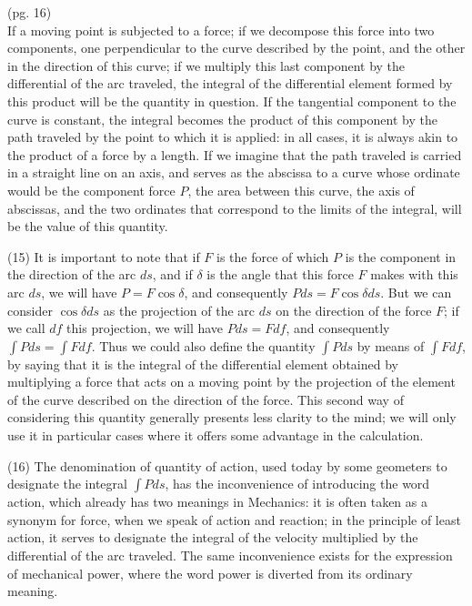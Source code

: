 \documentclass{book}
\begin{document}
\newpage
(pg. 16)\\
If a moving point is subjected to a force; if we decompose this force into two components, one perpendicular to the curve described by the point, and the other in the direction of this curve; if we multiply this last component by the differential of the arc traveled, the integral of the differential element formed by this product will be the quantity in question.
If the tangential component to the curve is constant, the integral becomes the product of this component by the path traveled by the point to which it is applied: in all cases, it is always akin to the product of a force by a length.
If we imagine that the path traveled is carried in a straight line on an axis, and serves as the abscissa to a curve whose ordinate would be the component force \(P\), the area between this curve, the axis of abscissas, and the two ordinates that correspond to the limits of the integral, will be the value of this quantity.

(15) It is important to note that if \(F\) is the force of which \(P\) is the component in the direction of the arc \(ds\), and if \(\delta\) is the angle that this force \(F\) makes with this arc \(ds\), we will have \(P = F \cos \delta\), and consequently \(Pds = F \cos \delta ds\). But we can consider \(\cos \delta ds\) as the projection of the arc \(ds\) on the direction of the force \(F\); if we call \(df\) this projection, we will have \(Pds = Fdf\), and consequently \(\int Pds = \int Fdf\). Thus we could also define the quantity \(\int Pds\) by means of \(\int Fdf\), by saying that it is the integral of the differential element obtained by multiplying a force that acts on a moving point by the projection of the element of the curve described on the direction of the force. This second way of considering this quantity generally presents less clarity to the mind; we will only use it in particular cases where it offers some advantage in the calculation.

(16) The denomination of quantity of action, used today by some geometers to designate the integral \(\int Pds\), has the inconvenience of introducing the word action, which already has two meanings in Mechanics: it is often taken as a synonym for force, when we speak of action and reaction; in the principle of least action, it serves to designate the integral of the velocity multiplied by the differential of the arc traveled.
The same inconvenience exists for the expression of mechanical power, where the word power is diverted from its ordinary meaning.
\end{document}
